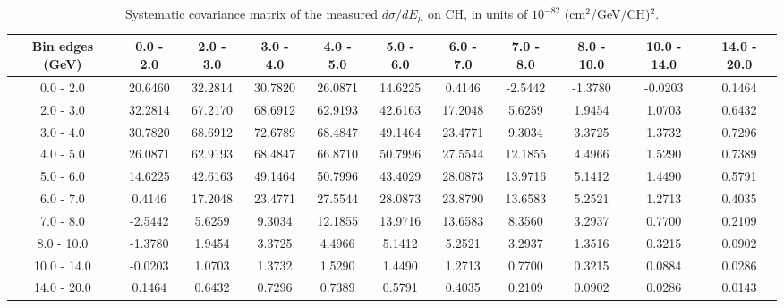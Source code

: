 \documentclass[aps,prl,twocolumn,superscriptaddress,nofootinbib]{revtex4-1}
\begin{document}
\begin{turnpage}
 \begin{table}[h!]
  \centering
  \caption{Systematic covariance matrix of the measured $d\sigma/dE_{\mu}$ on CH, in units of $10^{-82}$ (cm$^{2}$/GeV/CH)$^{2}$.}
    \begin{tabular}{c||cccccccccc}
      Bin edges (GeV) & 0.0 - 2.0 & 2.0 - 3.0 & 3.0 - 4.0 & 4.0 - 5.0 & 5.0 - 6.0 & 6.0 - 7.0 & 7.0 - 8.0 & 8.0 - 10.0 & 10.0 - 14.0 & 14.0 - 20.0 \\
\hline \hline
        0.0 - 2.0 & 20.6460 & 32.2814 & 30.7820 & 26.0871 & 14.6225 &  0.4146 & -2.5442 & -1.3780 & -0.0203 &  0.1464 \\
        2.0 - 3.0 & 32.2814 & 67.2170 & 68.6912 & 62.9193 & 42.6163 & 17.2048 &  5.6259 &  1.9454 &  1.0703 &  0.6432 \\
        3.0 - 4.0 & 30.7820 & 68.6912 & 72.6789 & 68.4847 & 49.1464 & 23.4771 &  9.3034 &  3.3725 &  1.3732 &  0.7296 \\
        4.0 - 5.0 & 26.0871 & 62.9193 & 68.4847 & 66.8710 & 50.7996 & 27.5544 & 12.1855 &  4.4966 &  1.5290 &  0.7389 \\
        5.0 - 6.0 & 14.6225 & 42.6163 & 49.1464 & 50.7996 & 43.4029 & 28.0873 & 13.9716 &  5.1412 &  1.4490 &  0.5791 \\
        6.0 - 7.0 &  0.4146 & 17.2048 & 23.4771 & 27.5544 & 28.0873 & 23.8790 & 13.6583 &  5.2521 &  1.2713 &  0.4035 \\
        7.0 - 8.0 & -2.5442 &  5.6259 &  9.3034 & 12.1855 & 13.9716 & 13.6583 &  8.3560 &  3.2937 &  0.7700 &  0.2109 \\
       8.0 - 10.0 & -1.3780 &  1.9454 &  3.3725 &  4.4966 &  5.1412 &  5.2521 &  3.2937 &  1.3516 &  0.3215 &  0.0902 \\
      10.0 - 14.0 & -0.0203 &  1.0703 &  1.3732 &  1.5290 &  1.4490 &  1.2713 &  0.7700 &  0.3215 &  0.0884 &  0.0286 \\
      14.0 - 20.0 &  0.1464 &  0.6432 &  0.7296 &  0.7389 &  0.5791 &  0.4035 &  0.2109 &  0.0902 &  0.0286 &  0.0143 \\
    \end{tabular}
  \label{tablecov:CH_Systematic_Emu}
  \end{table}
\end{turnpage}
\end{document}
